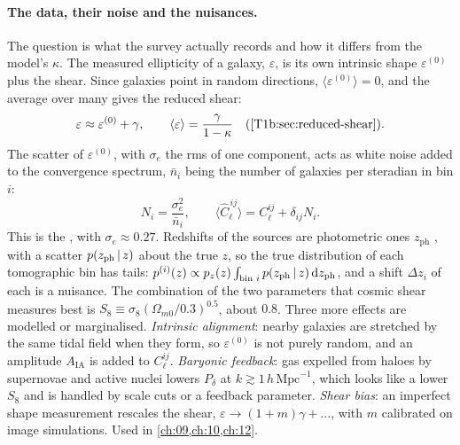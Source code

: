 \paragraph{The data, their noise and the nuisances.}
The question is what the survey actually records and how it differs from the model's $\kappa$. The measured ellipticity of a galaxy, $\varepsilon$, is its own intrinsic shape $\varepsilon^{(0)}$ plus the shear. Since galaxies point in random directions, $\langle\varepsilon^{(0)}\rangle=0$, and the average over many gives the reduced shear:
\begin{equation*}
\varepsilon\approx\varepsilon^{(0)}+\gamma,\qquad\langle\varepsilon\rangle=\frac{\gamma}{1-\kappa}\quad(\text{\cref{T1b:sec:reduced-shear}}).
\end{equation*}
The scatter of $\varepsilon^{(0)}$, with $\sigma_e$ the rms of one component, acts as white noise added to the convergence spectrum, $\bar n_i$ being the number of galaxies per steradian in bin $i$:
\begin{equation*}
N_i=\frac{\sigma_e^2}{\bar n_i},\qquad\langle\widehat C_\ell^{\,ij}\rangle=C_\ell^{ij}+\delta_{ij}N_i .
\end{equation*}
This is the , with $\sigma_e\approx0.27$. Redshifts of the sources are photometric ones $z_{\mathrm{ph}}$ , with a scatter $p(z_{\mathrm{ph}}\,\vert\, z)$ about the true $z$, so the true distribution of each tomographic bin has tails: $p^{(i)}(z)\propto p_z(z)\int_{\text{bin }i}p(z_{\mathrm{ph}}\,\vert\, z)\,\mathrm{d} z_{\mathrm{ph}}$, and a shift $\Delta z_i$ of each is a nuisance. The combination of the two parameters that cosmic shear measures best is $S_8\equiv\sigma_8(\Omega_{m0}/0.3)^{0.5}$, about $0.8$. Three more effects are modelled or marginalised. \emph{Intrinsic alignment}: nearby galaxies are stretched by the same tidal field when they form, so $\varepsilon^{(0)}$ is not purely random, and an amplitude $A_{\mathrm{IA}}$ is added to $C_\ell^{ij}$. \emph{Baryonic feedback}: gas expelled from haloes by supernovae and active nuclei lowers $P_\delta$ at $k\gtrsim1\,h\,\mathrm{Mpc}^{-1}$, which looks like a lower $S_8$ and is handled by scale cuts or a feedback parameter. \emph{Shear bias}: an imperfect shape measurement rescales the shear, $\varepsilon\to(1+m)\gamma+\dots$, with $m$ calibrated on image simulations. Used in \cref{ch:09,ch:10,ch:12}.


